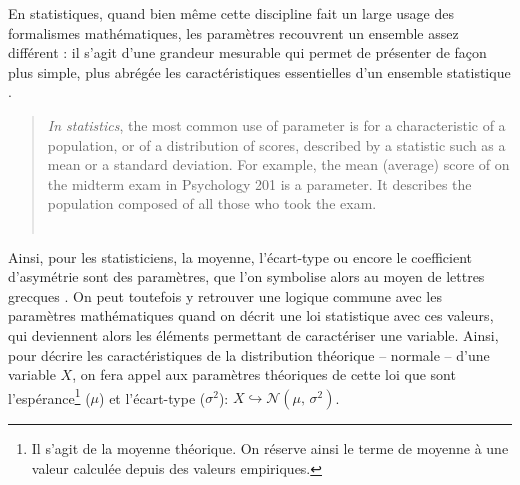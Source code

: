 En statistiques, quand bien même cette discipline fait un large usage des formalismes mathématiques, les paramètres recouvrent un ensemble assez différent :
	il s'agit d'une \og grandeur mesurable qui permet de présenter de façon plus simple, plus abrégée les caractéristiques essentielles d'un ensemble statistique\fg{} \autocite[Paramètre, \textsc{stat.} (calcul des probabilités)]{tresor1992}.
\begin{quotation}
	\noindent \og \textit{In statistics}, the most common use of \og parameter\fg{} is for a characteristic of a population, or of a distribution of scores, described by a statistic such as a mean or a standard deviation.
	For example, the mean (average) score of on the midterm exam in Psychology 201 is a parameter.
	It describes the population composed of all those who took the exam.\fg{}\\
	\mbox{}~ \hfill \autocite[164]{vogt1993dictionary}
\end{quotation}
Ainsi, pour les statisticiens, la moyenne, l'écart-type ou encore le coefficient d'asymétrie sont des paramètres, que l'on symbolise alors au moyen de lettres grecques \autocite[ibid.]{vogt1993dictionary}.
On peut toutefois y retrouver une logique commune avec les paramètres mathématiques quand on décrit une loi statistique avec ces valeurs, qui deviennent alors les éléments permettant de caractériser une variable.
Ainsi, pour décrire les caractéristiques de la distribution théorique -- normale -- d'une variable $X$, on fera appel aux paramètres théoriques de cette loi que sont l'espérance\footnote{
	Il s'agit de la moyenne théorique.
	On réserve ainsi le terme de moyenne à une valeur calculée depuis des valeurs empiriques.
} ($\mu$) et l'écart-type ($\sigma^{2}$): $X \hookrightarrow  \mathcal{N}(\mu,\,\sigma^{2})$.

